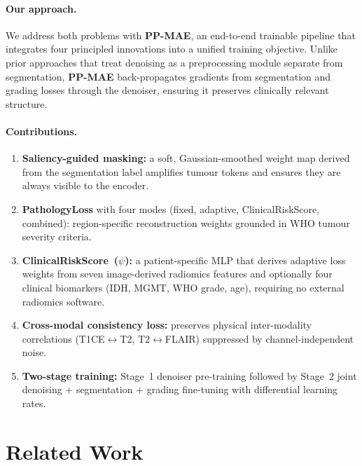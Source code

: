 \documentclass[runningheads]{llncs}
\newcommand{\ppmae}{\textbf{PP-MAE}}
\begin{document}
\paragraph{Our approach.}
We address both problems with \ppmae{}, an end-to-end trainable
pipeline that integrates four principled innovations into a unified
training objective.
Unlike prior approaches that treat denoising as a preprocessing module
separate from segmentation, \ppmae{} back-propagates gradients from
segmentation and grading losses through the denoiser, ensuring it
preserves clinically relevant structure.

\paragraph{Contributions.}
\begin{enumerate}
\item \textbf{Saliency-guided masking:} a soft, Gaussian-smoothed
      weight map derived from the segmentation label amplifies tumour
      tokens and ensures they are always visible to the encoder.
\item \textbf{PathologyLoss} with four modes (fixed, adaptive,
      ClinicalRiskScore, combined): region-specific reconstruction
      weights grounded in WHO tumour severity criteria.
\item \textbf{ClinicalRiskScore~($\psi$):} a patient-specific MLP
      that derives adaptive loss weights from seven image-derived
      radiomics features and optionally four clinical biomarkers
      (IDH, MGMT, WHO grade, age), requiring no external radiomics
      software.
\item \textbf{Cross-modal consistency loss:} preserves physical
      inter-modality correlations (T1CE$\leftrightarrow$T2,
      T2$\leftrightarrow$FLAIR) suppressed by channel-independent noise.
\item \textbf{Two-stage training:} Stage~1 denoiser pre-training
      followed by Stage~2 joint denoising + segmentation + grading
      fine-tuning with differential learning rates.
\end{enumerate}


\section{Related Work}
\label{sec:related}
\end{document}
